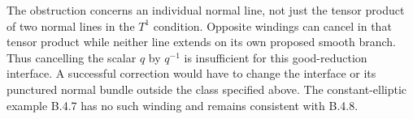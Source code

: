 \begin{remark}
The obstruction concerns an individual normal line,
not just the tensor product of two normal lines in
the $T^1$ condition.  Opposite windings can cancel in
that tensor product while neither line extends on its
own proposed smooth branch.  Thus cancelling the
scalar $q$ by $q^{-1}$ is insufficient for this
good-reduction interface.  A successful correction
would have to change the interface or its punctured
normal bundle outside the class specified above.
The constant-elliptic example B.4.7 has no such
winding and remains consistent with B.4.8.
\end{remark}
